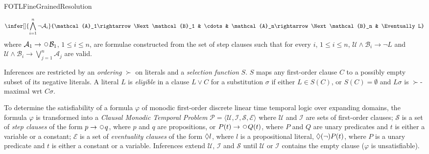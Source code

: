 \begin{entry}{FOTLFineGrainedResolution}
\begin{calculus}
\[
\infer[]%
 {\bigwedge_{i=1}^n\neg\mathcal{A}_i}
 {\mathcal{A}_1\rightarrow\Next\mathcal{B}_1 & \cdots &
  \mathcal{A}_n\rightarrow\Next\mathcal{B}_n & \Eventually L}\vspace*{-1.5ex}
\]
where $\mathcal{A}_1\rightarrow\Next\mathcal{B}_1$,
$1\leq i\leq n$, are formulae constructed from the set of step clauses
such that for every $i$, $1\leq i\leq n$,
$\mathcal{U}\land\mathcal{B}_i\rightarrow\neg L$
and 
$\mathcal{U}\land\mathcal{B}_i\rightarrow\bigvee_{j=1}^n
\mathcal{A}_j$ are valid.

Inferences are restricted by an \emph{ordering} $\succ$ on literals
and a \emph{selection function} $S$. $S$ maps any first-order clause $C$
to a possibly empty subset of its negative literals. 
A literal $L$ is \emph{eligible} in a clause $L\lor C$ for a
substitution $\sigma$ if either $L\in S(C)$, or $S(C)=\emptyset$  and
$L\sigma$ is $\succ$-maximal wrt $C\sigma$.
\end{calculus}


 \begin{clarifications}
%
To determine the satisfiability of a formula $\varphi$ of monodic first-order
discrete linear time temporal logic over expanding domains, the
formula $\varphi$ is transformed into a \emph{Clausal Monodic Temporal Problem}
$\mathcal{P} = \langle \mathcal{U, I, S, E} \rangle$ 
where $\mathcal{U}$
and $\mathcal{I}$ 
are sets of first-order clauses;
$\mathcal{S}$ 
is a set of \emph{step clauses} of the form
$p\rightarrow\Next q$,
where $p$ and $q$ are propositions, or
$P(t)\rightarrow\Next Q(t)$, where $P$ and $Q$ are unary predicates
and $t$ is either a variable or a constant;
$\mathcal{E}$  
is a set of \emph{eventuality clauses}
of the form $\Diamond l$, where $l$ is a propositional literal,
$\Diamond (\neg)P(t)$, where $P$ is a unary predicate and $t$ is
either a constant or a variable.
Inferences extend $\mathcal{U}$, $\mathcal{I}$ and $\mathcal{S}$ until
$\mathcal{U}$ or $\mathcal{I}$ contains the empty clause ($\varphi$ is
unsatisfiable).
\end{clarifications}


\end{entry}
